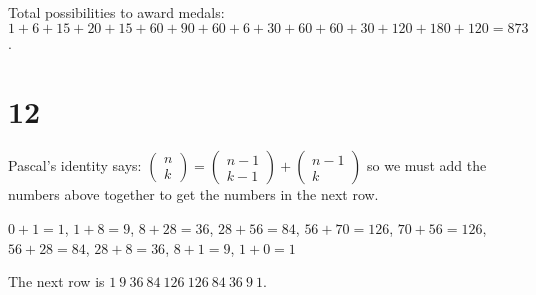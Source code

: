 \documentclass[12pt]{article}
\begin{document}
Total possibilities to award medals: $1 + 6 + 15 + 20 + 15 + 60 + 90 + 60 + 6 + 30 + 60 + 60 + 30 + 120 + 180 + 120 = 873$.

\section*{12}
Pascal's identity says: $\begin{pmatrix}
	n \\ k
\end{pmatrix}
= \begin{pmatrix}
	n - 1 \\ k - 1
\end{pmatrix}
+ \begin{pmatrix}
	n - 1 \\ k
\end{pmatrix}$ so we must add the numbers above together to get the numbers in the next row.

$0 + 1 = 1$, $1 + 8 = 9$, $8 + 28 = 36$, $28 + 56 = 84$, $56 + 70 = 126$, $70 + 56 = 126$, $56 + 28 = 84$, $28 + 8 = 36$, $8 + 1 = 9$, $1 + 0 = 1$

The next row is $1\ 9\ 36\ 84\ 126\ 126\ 84\ 36\ 9\ 1$.
\end{document}
